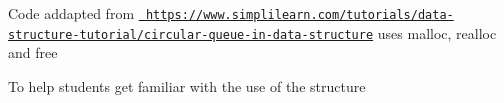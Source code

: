 Code addapted from \href{https://www.simplilearn.com/tutorials/data-structure-tutorial/circular-queue-in-data-structure}{\texttt{ https\+://www.\+simplilearn.\+com/tutorials/data-\/structure-\/tutorial/circular-\/queue-\/in-\/data-\/structure}} uses malloc, realloc and free

To help students get familiar with the use of the structure 